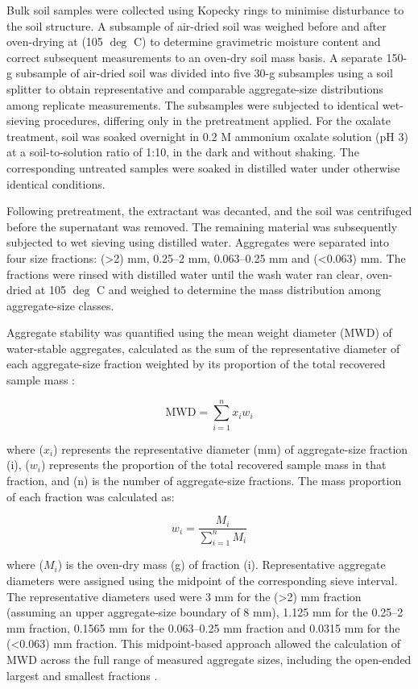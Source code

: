 \documentclass[preprint,12pt]{elsarticle}
\begin{document}
Bulk soil samples were collected using Kopecky rings to minimise disturbance to the soil structure. A subsample of air-dried soil was weighed before and after oven-drying at (105 $\deg$ C) to determine gravimetric moisture content and correct subsequent measurements to an oven-dry soil mass basis. A separate 150-g subsample of air-dried soil was divided into five 30-g subsamples using a soil splitter to obtain representative and comparable aggregate-size distributions among replicate measurements. The subsamples were subjected to identical wet-sieving procedures, differing only in the pretreatment applied. For the oxalate treatment, soil was soaked overnight in 0.2 M ammonium oxalate solution (pH 3) at a soil-to-solution ratio of 1:10, in the dark and without shaking. The corresponding untreated samples were soaked in distilled water under otherwise identical conditions.

Following pretreatment, the extractant was decanted, and the soil was centrifuged before the supernatant was removed. The remaining material was subsequently subjected to wet sieving using distilled water. Aggregates were separated into four size fractions: (>2) mm, 0.25--2 mm, 0.063--0.25 mm and (<0.063) mm. The fractions were rinsed with distilled water until the wash water ran clear, oven-dried at 105 $\deg$ C and weighed to determine the mass distribution among aggregate-size classes.

Aggregate stability was quantified using the mean weight diameter (MWD) of water-stable aggregates, calculated as the sum of the representative diameter of each aggregate-size fraction weighted by its proportion of the total recovered sample mass \citep{Abiven2009,KemperRosenau2018,Franzluebbers2022,Jimenez2025}:

\begin{equation}
    \mathrm{MWD} =
    \sum_{i=1}^{n} x_i w_i
    \label{eq:mwd}
\end{equation}
  
where ($x_i$) represents the representative diameter (mm) of aggregate-size fraction (i), ($w_i$) represents the proportion of the total recovered sample mass in that fraction, and (n) is the number of aggregate-size fractions. The mass proportion of each fraction was calculated as:
  
\begin{equation}
    w_i =
    \frac{M_i}{\sum_{i=1}^{n} M_i}
    \label{eq:mass_proportion}
\end{equation}

where ($M_i$) is the oven-dry mass (g) of fraction (i). Representative aggregate diameters were assigned using the midpoint of the corresponding sieve interval. The representative diameters used were 3 mm for the (>2) mm fraction (assuming an upper aggregate-size boundary of 8 mm), 1.125 mm for the 0.25--2 mm fraction, 0.1565 mm for the 0.063--0.25 mm fraction and 0.0315 mm for the (<0.063) mm fraction. This midpoint-based approach allowed the calculation of MWD across the full range of measured aggregate sizes, including the open-ended largest and smallest fractions \citep{Franzluebbers2022,Jimenez2025}.
\end{document}
